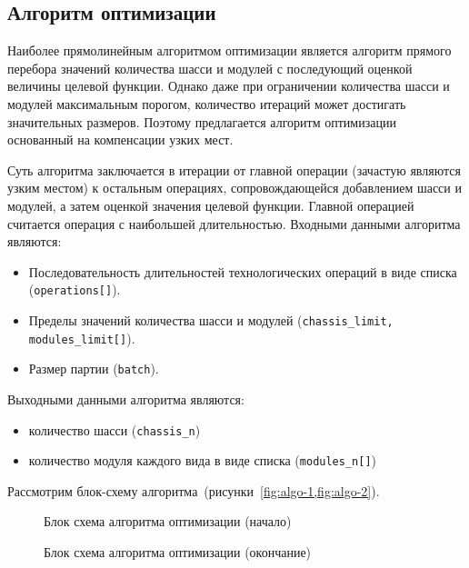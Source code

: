 \subsection{Алгоритм оптимизации}

Наиболее прямолинейным алгоритмом оптимизации является алгоритм прямого перебора значений количества шасси и модулей с последующий оценкой величины целевой функции. Однако даже при ограничении количества шасси и модулей максимальным порогом, количество итераций может достигать значительных размеров. Поэтому предлагается алгоритм оптимизации основанный на компенсации узких мест.

Суть алгоритма заключается в итерации от главной операции (зачастую являются узким местом) к остальным операциях, сопровождающейся добавлением шасси и модулей, а затем оценкой значения целевой функции. Главной операцией считается операция с наибольшей длительностью. Входными данными алгоритма являются:

\begin{itemize}
	\item Последовательность длительностей технологических операций в виде списка (\texttt{operations[]}).
	\item Пределы значений количества шасси и модулей (\texttt{chassis\_limit, modules\_limit[]}).
	\item Размер партии (\texttt{batch}).
\end{itemize}


Выходными данными алгоритма являются:
\begin{itemize}
	\item количество шасси (\texttt{chassis\_n})
	\item количество модуля каждого вида в виде списка (\texttt{modules\_n[]})
\end{itemize}


Рассмотрим блок-схему алгоритма~(рисунки~\cref{fig:algo-1,fig:algo-2}).

\begin{figure}[!b]
	\caption{Блок схема алгоритма оптимизации (начало)}\label{fig:algo-1}
\end{figure}

\begin{figure}[!t]
	\caption{Блок схема алгоритма оптимизации (окончание)}\label{fig:algo-2}
\end{figure}


